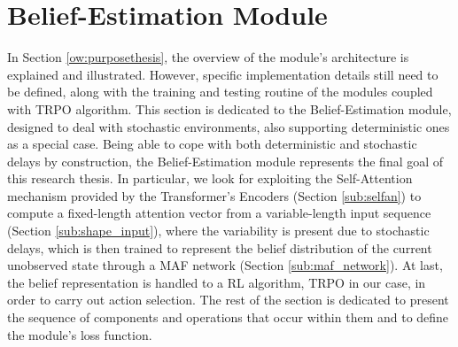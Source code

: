     \section{Belief-Estimation Module}
        \label{ow:beliefmodule}
        In Section \ref{ow:purposethesis}, the overview of the module’s architecture is explained and illustrated. However, specific implementation details still need to be defined, along with the training and testing routine of the modules coupled with TRPO algorithm. \newline
        This section is dedicated to the Belief-Estimation module, designed to deal with stochastic environments, also supporting deterministic ones as a special case. Being able to cope with both deterministic and stochastic delays by construction, the Belief-Estimation module represents the final goal of this research thesis. In particular, we look for exploiting the Self-Attention mechanism provided by the Transformer's Encoders (Section \ref{sub:selfan}) to compute a fixed-length attention vector from a variable-length input sequence (Section \ref{sub:shape_input}), where the variability is present due to stochastic delays, which is then trained to represent the belief distribution of the current unobserved state through a MAF network (Section \ref{sub:maf_network}). At last, the belief representation is handled to a RL algorithm, TRPO in our case, in order to carry out action selection. The rest of the section is dedicated to present the sequence of components and operations that occur within them and to define the module's loss function.
        
